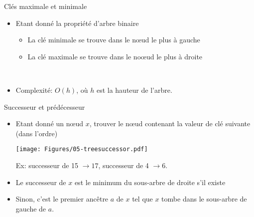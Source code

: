 \begin{frame}{Clés maximale et minimale}
\begin{itemize}
\item Etant donné la propriété d'arbre binaire
\begin{itemize}
\item La clé minimale se trouve dans le n\oe ud le plus à gauche
\item La clé maximale se trouve dans le no\oe ud le plus à droite
\end{itemize}

\bigskip

\begin{center}
~~~~~
\end{center}

\bigskip

\item Complexité: $O(h)$, où $h$ est la hauteur de l'arbre.
\end{itemize}
\end{frame}

\begin{frame}{Successeur et prédécesseur}
\begin{itemize}
\item Etant donné un n\oe ud $x$, trouver le n\oe ud contenant la valeur de clé suivante (dans l'ordre)

\begin{center}
\texttt{[image: Figures/05-treesuccessor.pdf]}

\bigskip

Ex: successeur de 15 $\rightarrow 17$, successeur de 4 $\rightarrow 6$.
\end{center}


\item Le successeur de $x$ est le minimum du sous-arbre de droite s'il existe
\item Sinon, c'est le premier ancêtre $a$ de $x$ tel que $x$ tombe dans le sous-arbre de gauche de $a$.
\end{itemize}
\end{frame}

